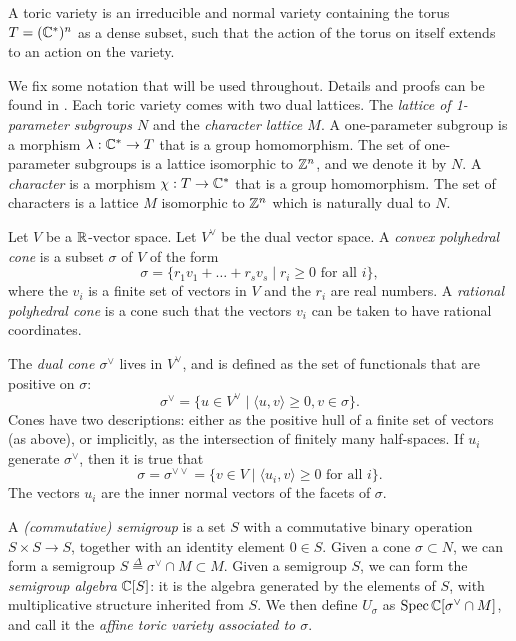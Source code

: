 A toric variety is an irreducible and normal variety containing the torus $T=(\mathbb{C}^\ast)^n$  as a dense subset, such that the action of the torus on itself extends to an action on the variety.

We fix some notation that will be used throughout. Details and proofs can be found in \cite{cox_toric,fulton_toric}. Each toric variety comes with two dual lattices. The \emph{lattice of 1-parameter subgroups $N$} and the \emph{character lattice $M$}. A one-parameter subgroup is a morphism $\lambda:\mathbb{C} ^\ast \to T$ that is a group homomorphism. The set of one-parameter subgroups is a lattice isomorphic to $\mathbb{Z}^n$, and we denote it by $N$. A \emph{character} is a morphism $\chi:T \to \mathbb{C}^\ast$ that is a group homomorphism. The set of characters is a lattice $M$ isomorphic to $\mathbb{Z}^n$ which is naturally dual to $N$.

Let $V$ be a $\mathbb{R}$-vector space. Let $V^\vee$ be the dual vector space. A \emph{convex polyhedral cone} is a subset $\sigma$ of $V$ of the form
$$
\sigma = \{ r_1 v_1 + \ldots + r_s v_s \mid r_i \geq 0 \text{ for all } i \},
$$
where the $v_i$ is a finite set of vectors in $V$ and the $r_i$ are real numbers. A \emph{rational polyhedral cone} is a cone such that the vectors $v_i$ can be taken to have rational coordinates.

The \emph{dual cone $\sigma^\vee$} lives in $V^\vee$, and is defined as the set of functionals that are positive on $\sigma$:
$$
\sigma^\vee = \{ u \in V^\vee \mid \langle u,v\rangle \geq 0, v \in \sigma \}.
$$
Cones have two descriptions: either as the positive hull of a finite set of vectors (as above), or implicitly, as the intersection of finitely many half-spaces. If $u_i$ generate $\sigma^\vee$, then it is true that
$$
\sigma = \sigma^{\vee \vee } = \{ v \in V \mid \langle u_i,v \rangle \geq 0 \text{ for all } i \}.
$$
The vectors $u_i$ are the inner normal vectors of the facets of $\sigma$.

A \emph{(commutative) semigroup} is a set $S$ with a commutative binary operation $S \times S \to S$, together with an identity element $0 \in S$. Given a cone $\sigma \subset N$, we can form a semigroup $S\stackrel{\Delta}{=} \sigma^\vee \cap M \subset M$. Given a semigroup $S$, we can form the \emph{semigroup algebra} $\mathbb{C}[S]$: it is the algebra generated by the elements of $S$, with multiplicative structure inherited from $S$. We then define $U_\sigma$ as $\operatorname{Spec} \mathbb{C}[\sigma^\vee \cap M]$, and call it the \emph{affine toric variety associated to $\sigma$}. 

